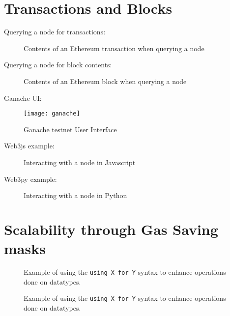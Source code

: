 \begin{appendices}

\chapter{Transactions and Blocks}
Querying a node for transactions:
\begin{figure}[H]
    \centering
    
    \caption{Contents of an Ethereum transaction when querying a node}
    \label{fig:transaction}
\end{figure}

Querying a node for block contents:
\begin{figure}[H]
    \centering
    
    \caption{Contents of an Ethereum block when querying a node}
    \label{fig:block}
\end{figure}

Ganache UI:
\begin{figure}[H]
    \centering
    \texttt{[image: ganache]}
    \caption{Ganache testnet User Interface}
    \label{fig:ganache}
    
\end{figure}

Web3js example:
\begin{figure}[H]
    \centering
    
    \caption{Interacting with a node in Javascript}
    \label{fig:web3js}
\end{figure}

Web3py example:
\begin{figure}[H]
    \centering
    
    \caption{Interacting with a node in Python}
    \label{fig:web3py}
\end{figure}

\chapter{Scalability through Gas Saving masks} \label{apx:scalability}

\begin{figure}[ht!]
    \centering
    
    \caption{Example of using the \texttt{using X for Y} syntax to enhance operations done on datatypes.}
    \label{fig:library}
\end{figure}


\begin{figure}[ht!]
    \centering
    
    \caption{Example of using the \texttt{using X for Y} syntax to enhance operations done on datatypes.}
    \label{apx:scalability:overflow}
\end{figure}




\end{appendices}
